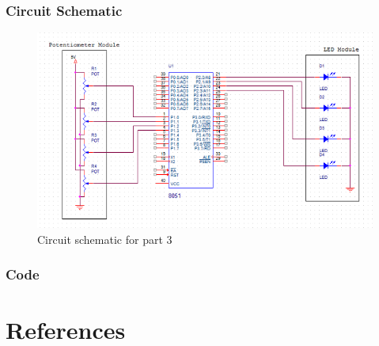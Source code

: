 \documentclass[12pt]{article}
\begin{document}
	\subsubsection{Circuit Schematic}
		\begin{figure}[h]
			\includegraphics{schematic.png}
			\caption{Circuit schematic for part 3}
			\label{schematic}
		\end{figure} 
	\subsubsection{Code}
		
	
	
\section{References} 
\end{document}
